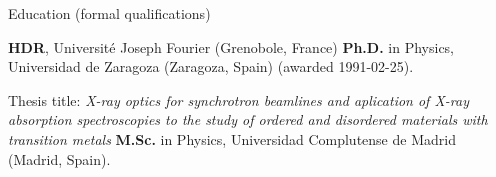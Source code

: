 \begin{rubric}{Education (formal qualifications)}

\entry*[2004]%
    \textbf{HDR}, Universit\'e Joseph Fourier (Grenobole, France)
\entry*[1986-1991]%
	\textbf{Ph.D.} in Physics, Universidad de Zaragoza (Zaragoza, Spain) (awarded 1991-02-25).
	\par Thesis title: \emph{X-ray optics for synchrotron beamlines and aplication of X-ray absorption spectroscopies to the study of ordered and disordered materials with transition metals}
\entry*[1980-1986]%
	\textbf{M.Sc.} in Physics, Universidad Complutense de Madrid (Madrid, Spain).
%
\end{rubric}